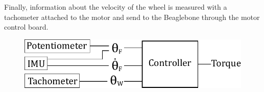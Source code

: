 Finally, information about the velocity of the wheel is measured with a tachometer attached to the motor and send to the Beaglebone through the motor control board. 
\\
\begin{figure}[H]\vspace{-4mm}
	\centering
	\includegraphics[scale=.75]{figures/measurements}
	\label{fig:measurements}
\end{figure}\vspace{-5mm}
